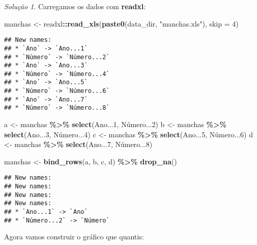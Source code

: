 \documentclass[
]{latex/krantz}
\newenvironment{Shaded}{\begin{snugshade}}{\end{snugshade}}
\newcommand{\AttributeTok}[1]{\textcolor[rgb]{0.13,0.29,0.53}{#1}}
\newcommand{\DecValTok}[1]{\textcolor[rgb]{0.00,0.00,0.81}{#1}}
\newcommand{\FunctionTok}[1]{\textcolor[rgb]{0.13,0.29,0.53}{\textbf{#1}}}
\newcommand{\NormalTok}[1]{#1}
\newcommand{\OtherTok}[1]{\textcolor[rgb]{0.56,0.35,0.01}{#1}}
\newcommand{\SpecialCharTok}[1]{\textcolor[rgb]{0.81,0.36,0.00}{\textbf{#1}}}
\newcommand{\StringTok}[1]{\textcolor[rgb]{0.31,0.60,0.02}{#1}}
\theoremstyle{definition}
\theoremstyle{definition}
\theoremstyle{definition}
\theoremstyle{definition}
\theoremstyle{remark}
\newtheorem*{solution}{Solução}
\begin{document}
\begin{solution}
Carregamos os dados com \textbf{readxl}:

\begin{Shaded}
\begin{Highlighting}[]
\NormalTok{manchas }\OtherTok{\textless{}{-}}\NormalTok{ readxl}\SpecialCharTok{::}\FunctionTok{read\_xls}\NormalTok{(}\FunctionTok{paste0}\NormalTok{(data\_dir, }\StringTok{"manchas.xls"}\NormalTok{), }\AttributeTok{skip =} \DecValTok{4}\NormalTok{)}
\end{Highlighting}
\end{Shaded}

\begin{verbatim}
## New names:
## * `Ano` -> `Ano...1`
## * `Número` -> `Número...2`
## * `Ano` -> `Ano...3`
## * `Número` -> `Número...4`
## * `Ano` -> `Ano...5`
## * `Número` -> `Número...6`
## * `Ano` -> `Ano...7`
## * `Número` -> `Número...8`
\end{verbatim}

\begin{Shaded}
\begin{Highlighting}[]
\NormalTok{a }\OtherTok{\textless{}{-}}\NormalTok{ manchas }\SpecialCharTok{\%\textgreater{}\%} \FunctionTok{select}\NormalTok{(Ano...}\DecValTok{1}\NormalTok{, Número...}\DecValTok{2}\NormalTok{)}
\NormalTok{b }\OtherTok{\textless{}{-}}\NormalTok{ manchas }\SpecialCharTok{\%\textgreater{}\%} \FunctionTok{select}\NormalTok{(Ano...}\DecValTok{3}\NormalTok{, Número...}\DecValTok{4}\NormalTok{)}
\NormalTok{c }\OtherTok{\textless{}{-}}\NormalTok{ manchas }\SpecialCharTok{\%\textgreater{}\%} \FunctionTok{select}\NormalTok{(Ano...}\DecValTok{5}\NormalTok{, Número...}\DecValTok{6}\NormalTok{)}
\NormalTok{d }\OtherTok{\textless{}{-}}\NormalTok{ manchas }\SpecialCharTok{\%\textgreater{}\%} \FunctionTok{select}\NormalTok{(Ano...}\DecValTok{7}\NormalTok{, Número...}\DecValTok{8}\NormalTok{)}

\NormalTok{manchas }\OtherTok{\textless{}{-}} \FunctionTok{bind\_rows}\NormalTok{(a, b, c, d) }\SpecialCharTok{\%\textgreater{}\%} \FunctionTok{drop\_na}\NormalTok{()}
\end{Highlighting}
\end{Shaded}

\begin{verbatim}
## New names:
## New names:
## New names:
## New names:
## * `Ano...1` -> `Ano`
## * `Número...2` -> `Número`
\end{verbatim}

Agora vamos construir o gráfico que quantis:


\end{solution}
\end{document}
